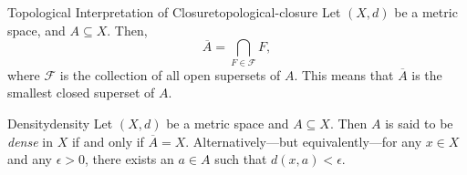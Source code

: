 \documentclass{article}
\numberwithin{equation}{section}
\numberwithin{figure}{section}
\begin{document}
\begin{definition}{Topological Interpretation of Closure}{topological-closure}
    Let $ (X, d) $ be a metric space, and $ A \subseteq X $. Then,
    \begin{equation}
        \overline{A} = \bigcap_{F \in \mathcal{F}} F,
    \end{equation}
    where $ \mathcal{F} $ is the collection of all open supersets of $ A $. This
    means that $ \overline{A} $ is the smallest closed superset of $ A $.
\end{definition}
\begin{definition}{Density}{density}
    Let $ (X, d) $ be a metric space and $ A \subseteq X $. Then $ A $ is said
    to be \emph{dense} in $ X $ if and only if $ \overline{A} = X $.
    Alternatively---but equivalently---for any $ x \in X $ and any $ \epsilon >
    0 $, there exists an $ a \in A $ such that $ d(x, a) < \epsilon $.
\end{definition}
\end{document}
